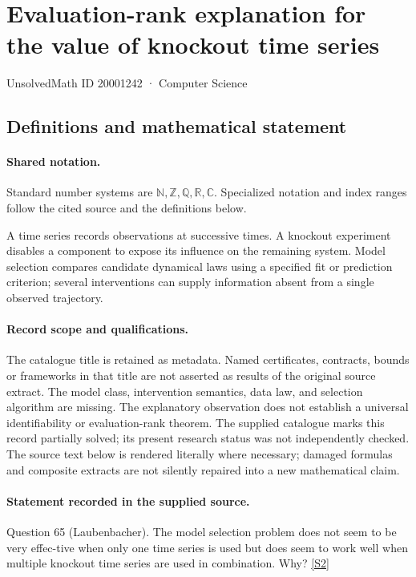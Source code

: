 \documentclass[11pt]{article}
\newcommand{\sref}[2]{\hyperlink{source:#1:#2}{[S#2]}}
\begin{document}
\setcounter{section}{20001241}
\section{Evaluation-rank explanation for the value of knockout time series}\label{20001242}
{\small\sffamily UnsolvedMath ID 20001242 · Computer Science}
\subsection{Definitions and mathematical statement}

\paragraph{Shared notation.}Standard number systems are $\mathbb N,\mathbb Z,\mathbb Q,\mathbb R,\mathbb C$. Specialized notation and index ranges follow the cited source and the definitions below.


A time series records observations at successive times. A knockout experiment disables a component to expose its influence on the remaining system. Model selection compares candidate dynamical laws using a specified fit or prediction criterion; several interventions can supply information absent from a single observed trajectory.
\paragraph{Record scope and qualifications.}
The catalogue title is retained as metadata. Named certificates, contracts, bounds or frameworks in that title are not asserted as results of the original source extract.
The model class, intervention semantics, data law, and selection algorithm are missing. The explanatory observation does not establish a universal identifiability or evaluation-rank theorem. The supplied catalogue marks this record partially solved; its present research status was not independently checked.
The source text below is rendered literally where necessary; damaged formulas and composite extracts are not silently repaired into a new mathematical claim.
\paragraph{Statement recorded in the supplied source.}
Question 65 (Laubenbacher). The model selection problem does not seem to be very effec-tive when only one time series is used but does seem to work well when multiple knockout time series are used in combination. Why? \sref{20001242}{2}
\end{document}
